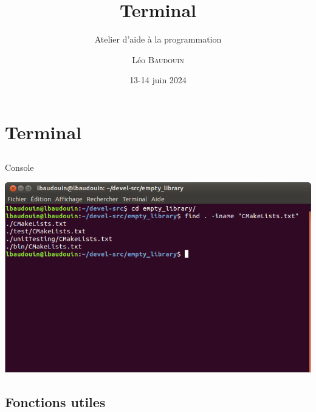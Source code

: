 \documentclass{beamer}
\title{Terminal}
\subtitle{Atelier d'aide à la programmation}
\author{L\'eo \textsc{Baudouin}}
\institute{
  {\url{baudouin.leo @ gmail.com}}
}
\date{13-14 juin 2024}
\begin{document}
\begin{frame}
  \titlepage
\end{frame}


\section{Terminal}

\subsection{}

\begin{frame}{Console}

\includegraphics[width=\linewidth]{images/terminal-exemple}

\end{frame}

\subsection{Fonctions utiles}
\end{document}
